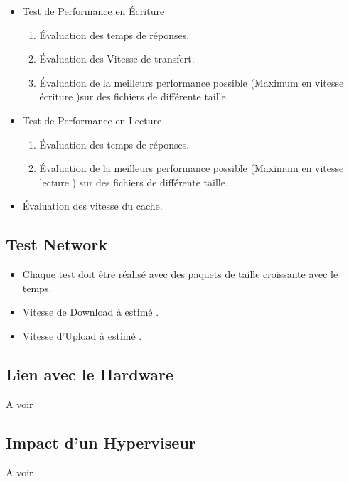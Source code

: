 \documentclass[french]{article}
\begin{document}
\begin{itemize}
\item Test de Performance en Écriture 
		\begin{enumerate}
		\item Évaluation des temps de réponses. 
		\item Évaluation des Vitesse de transfert.
		\item Évaluation de la meilleurs performance possible (Maximum en vitesse écriture )sur des fichiers de différente taille.
		\end{enumerate}
\item Test de Performance en Lecture 
		\begin{enumerate}
		\item Évaluation des temps de réponses. 
		\item Évaluation de la meilleurs performance possible (Maximum en vitesse lecture ) sur des fichiers de différente taille. 
		\end{enumerate}
\item Évaluation des vitesse du cache.
\end{itemize}

\subsection{Test Network}
\begin{itemize}
\item Chaque test doit être réalisé avec des paquets de taille croissante avec le temps.
\item Vitesse de Download à estimé .
\item Vitesse d'Upload à estimé .
\end{itemize}
\subsection{Lien avec le Hardware}
A voir 
\subsection{Impact d'un Hyperviseur}
A voir 
\end{document}
